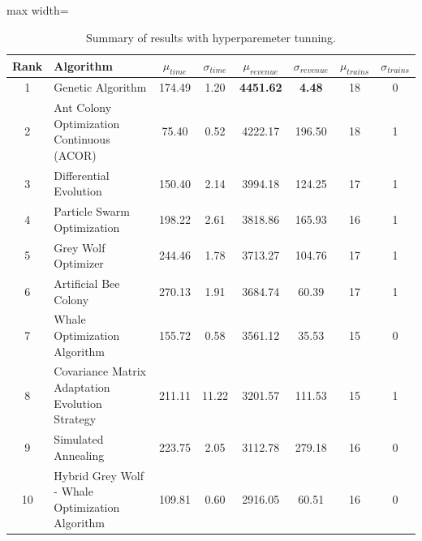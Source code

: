 \documentclass[Afour,sagev,times]{sagej}
\begin{document}
\begin{table}[htbp]
\centering
\caption{Summary of results with hyperparemeter tunning.}
\begin{adjustbox}{max width=\textwidth}
\begin{tabular}{|c|l|c|c|c|c|c|c|}
\hline
\textbf{Rank} & \textbf{Algorithm} & \(\mu_{time}\) & \(\sigma_{time}\) & \(\mu_{revenue}\) & \(\sigma_{revenue}\) & \(\mu_{trains}\) & \(\sigma_{trains}\) \\ \hline \hline
1 & Genetic Algorithm & 174.49 & 1.20 & \textbf{4451.62} & \textbf{4.48} & 18 & 0 \\ \hline
2 & Ant Colony Optimization Continuous (ACOR) & 75.40 & 0.52 & 4222.17 & 196.50 & 18 & 1 \\ \hline
3 & Differential Evolution & 150.40 & 2.14 & 3994.18 & 124.25 & 17 & 1 \\ \hline
4 & Particle Swarm Optimization & 198.22 & 2.61 & 3818.86 & 165.93 & 16 & 1 \\ \hline
5 & Grey Wolf Optimizer & 244.46 & 1.78 & 3713.27 & 104.76 & 17 & 1 \\ \hline
6 & Artificial Bee Colony & 270.13 & 1.91 & 3684.74 & 60.39 & 17 & 1 \\ \hline
7 & Whale Optimization Algorithm & 155.72 & 0.58 & 3561.12 & 35.53 & 15 & 0 \\ \hline
8 & Covariance Matrix Adaptation Evolution Strategy & 211.11 & 11.22 & 3201.57 & 111.53 & 15 & 1 \\ \hline
9 & Simulated Annealing & 223.75 & 2.05 & 3112.78 & 279.18 & 16 & 0 \\ \hline
10 & Hybrid Grey Wolf - Whale Optimization Algorithm & 109.81 & 0.60 & 2916.05 & 60.51 & 16 & 0 \\ \hline
\end{tabular}
\end{adjustbox}
\label{tab:summary_results_compactHIPER}
\end{table}
\end{document}
